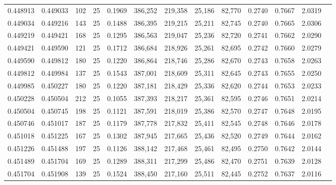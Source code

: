 \begin{tabular}{rrrrrrrrrrrrr}
0.448913 & 0.449033 &   102 &  25 &                                     0.1969 & 386,252 & 219,358 &  25,186 &  82,770 & 0.2740 & 0.7667 & 2.0319 \\
0.449034 & 0.449216 &   143 &  25 &                                     0.1488 & 386,395 & 219,215 &  25,211 &  82,745 & 0.2740 & 0.7665 & 2.0306 \\
0.449219 & 0.449421 &   168 &  25 &                                     0.1295 & 386,563 & 219,047 &  25,236 &  82,720 & 0.2741 & 0.7662 & 2.0290 \\
0.449421 & 0.449590 &   121 &  25 &                                     0.1712 & 386,684 & 218,926 &  25,261 &  82,695 & 0.2742 & 0.7660 & 2.0279 \\
0.449590 & 0.449812 &   180 &  25 &                                     0.1220 & 386,864 & 218,746 &  25,286 &  82,670 & 0.2743 & 0.7658 & 2.0263 \\
0.449812 & 0.449984 &   137 &  25 &                                     0.1543 & 387,001 & 218,609 &  25,311 &  82,645 & 0.2743 & 0.7655 & 2.0250 \\
0.449985 & 0.450227 &   180 &  25 &                                     0.1220 & 387,181 & 218,429 &  25,336 &  82,620 & 0.2744 & 0.7653 & 2.0233 \\
0.450228 & 0.450504 &   212 &  25 &                                     0.1055 & 387,393 & 218,217 &  25,361 &  82,595 & 0.2746 & 0.7651 & 2.0214 \\
0.450504 & 0.450745 &   198 &  25 &                                     0.1121 & 387,591 & 218,019 &  25,386 &  82,570 & 0.2747 & 0.7648 & 2.0195 \\
0.450746 & 0.451017 &   187 &  25 &                                     0.1179 & 387,778 & 217,832 &  25,411 &  82,545 & 0.2748 & 0.7646 & 2.0178 \\
0.451018 & 0.451225 &   167 &  25 &                                     0.1302 & 387,945 & 217,665 &  25,436 &  82,520 & 0.2749 & 0.7644 & 2.0162 \\
0.451226 & 0.451488 &   197 &  25 &                                     0.1126 & 388,142 & 217,468 &  25,461 &  82,495 & 0.2750 & 0.7642 & 2.0144 \\
0.451489 & 0.451704 &   169 &  25 &                                     0.1289 & 388,311 & 217,299 &  25,486 &  82,470 & 0.2751 & 0.7639 & 2.0128 \\
0.451704 & 0.451908 &   139 &  25 &                                     0.1524 & 388,450 & 217,160 &  25,511 &  82,445 & 0.2752 & 0.7637 & 2.0116 \\

\end{tabular}

